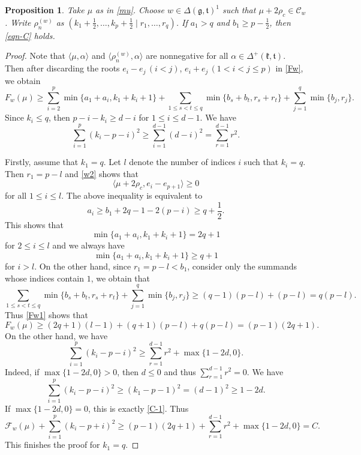 \documentclass[11pt]{amsart}
\theoremstyle{plain}
\newtheorem{prop}[thm]{Proposition}
\theoremstyle{definition}
\newcommand{\mfg}{\mathfrak{g}}
\newcommand{\mfk}{\mathfrak{k}}
\newcommand{\mft}{\mathfrak{t}}
\newcommand{\C}{\mathcal{C}}
\newcommand{\F}{\mathcal{F}}
\begin{document}
\begin{prop}
	Take $\mu$ as in \eqref{mu}.  Choose $w\in \Delta(\mfg,\mft)^1$ such that $\mu+2\rho_c\in \C_w$. Write $\rho_n^{(w)}$ as $(k_1+\frac{1}{2},\dots,k_p+\frac{1}{2}\mid r_1,\dots,r_q)$. If $a_1>q$ and $b_1\ge p-\frac{1}{2}$, then \eqref{eqn-C} holds.
\end{prop}

\begin{proof}
	 Note that $\langle \mu,\alpha\rangle$ and $\langle\rho_n^{(w)},\alpha\rangle$ are nonnegative for all $\alpha\in \Delta^+(\mfk,\mft)$. Then after discarding the roots  $e_i-e_j \,(i<j)$, $e_i+e_j \,(1<i<j\le p)$ in \eqref{Fw}, we obtain
	\begin{equation}\label{Fw1}
		F_w(\mu)\ge \sum_{i=2}^p\min\{a_1+a_i, k_1+k_i+1\}+\sum_{1\le s<t\le q}\min\{b_s+b_t, r_s+r_t\}+\sum_{j=1}^q\min\{b_j, r_j\}.
	\end{equation}
		Since $k_i\le q$, then $p-i-k_i\ge d-i$ for $1\le i\le d-1$. We have
	\begin{equation}\label{C-1}
		\sum_{i=1}^p (k_i-p-i)^2\ge\sum_{i=1}^{d-1}(d-i)^2=\sum_{r=1}^{d-1}r^2.
	\end{equation}
	
	Firstly, assume that $k_1=q$. Let $l$ denote the number of indices $i$ such that $k_i=q$. Then $r_1=p-l$ and \eqref{w2} shows that
	\[\langle\mu+2\rho_c, e_i-e_{p+1}\rangle\ge 0\]
	for all $1\le i\le l$. The above inequality is equivalent to
	\[a_i\ge b_1+2q-1-2(p-i)\ge q+\frac{1}{2}.\]
	This shows that
	\[\min\{a_1+a_i, k_1+k_i+1\}=2q+1\]
	for $2\le i\le l$ and we always have
	\[\min\{a_1+a_i, k_1+k_i+1\}\ge q+1\]
	for $i>l$. On the other hand, since $r_1=p-l<b_1$, consider only the summands whose indices contain $1$, we obtain that
	\[\sum_{1\le s<t\le q}\min\{b_s+b_t, r_s+r_t\}+\sum_{j=1}^q\min\{b_j, r_j\}\ge (q-1)(p-l)+(p-l)=q(p-l).\]
	Thus \eqref{Fw1} shows that
	\[F_w(\mu)\ge (2q+1)(l-1)+(q+1)(p-l)+q(p-l)=(p-1)(2q+1).\]
	On the other hand, we have
	\[\sum_{i=1}^p (k_i-p-i)^2\ge\sum_{r=1}^{d-1}r^2+\max\{1-2d,0\}.\]
	Indeed, if $\max\{1-2d,0\}> 0$, then $d\le 0$ and thus $\sum_{r=1}^{d-1}r^2=0$. We have
	\[\sum_{i=1}^p (k_i-p-i)^2\ge(k_1-p-1)^2=(d-1)^2\ge 1-2d.\]
	If $\max\{1-2d,0\}=0$, this is exactly \eqref{C-1}. Thus
	\[\F_w(\mu)+\sum_{i=1}^p(k_i-p+i)^2\ge (p-1)(2q+1)+\sum_{r=1}^{d-1}r^2+\max\{1-2d,0\}=C.\]
	This finishes the proof for $k_1=q$.
	

\end{proof}
\end{document}
